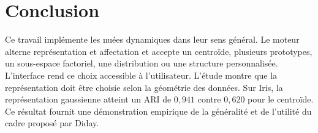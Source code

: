 \documentclass[12pt,a4paper]{article}
\begin{document}
\section{Conclusion}
Ce travail implémente les nuées dynamiques dans leur sens général. Le moteur
alterne représentation et affectation et accepte un centroïde, plusieurs
prototypes, un sous-espace factoriel, une distribution ou une structure
personnalisée. L'interface rend ce choix accessible à l'utilisateur. L'étude
montre que la représentation doit être choisie selon la géométrie des données.
Sur Iris, la représentation gaussienne atteint un ARI de $0{,}941$ contre
$0{,}620$ pour le centroïde. Ce résultat fournit une démonstration empirique de
la généralité et de l'utilité du cadre proposé par Diday.



\end{document}
